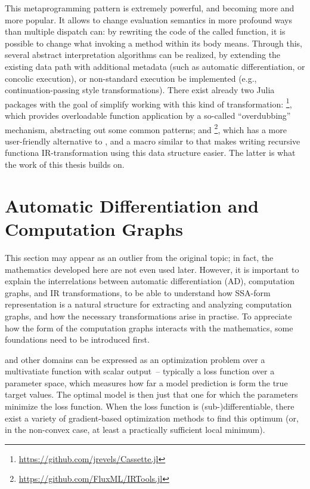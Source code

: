 This metaprogramming pattern is extremely powerful, and becoming more and more popular.  It allows
to change evaluation semantics in more profound ways than multiple dispatch can: by rewriting the
code of the called function, it is possible to change what invoking a method within its body means.
Through this, several abstract interpretation algorithms can be realized, by extending the existing
data path with additional metadata (such as automatic differentiation, or concolic execution), or
non-standard execution be implemented (e.g., continuation-passing style transformations).  There
exist already two Julia packages with the goal of simplify working with this kind of transformation:
\footnote{\protect\url{https://github.com/jrevels/Cassette.jl}}, which
provides overloadable function application by a so-called \enquote{overdubbing} mechanism,
abstracting out some common patterns; and
\footnote{\protect\url{https://github.com/FluxML/IRTools.jl}}, which has a
more user-friendly alternative to , and a macro similar to  that
makes writing recursive functiona IR-transformation using this data structure easier.  The latter is
what the work of this thesis builds on.


\section[Automatic Differentiation and Computation Graphs]{Automatic Differentiation and \newline
  Computation Graphs}
\label{sec:cg-ad}

This section may appear as an outlier from the original topic; in fact, the mathematics developed
here are not even used later.  However, it is important to explain the interrelations between
automatic differentiation (AD), computation graphs, and IR transformations, to be able to understand
how SSA-form representation is a natural structure for extracting and analyzing computation graphs,
and how the necessary transformations arise in practise.  To appreciate how the form of the
computation graphs interacts with the mathematics, some foundations need to be introduced first.

 and other domains can be expressed as an
optimization problem over a multivatiate function with scalar output~-- typically a loss function
over a parameter space, which measures how far a model prediction is form the true target values.
The optimal model is then just that one for which the parameters minimize the loss function.  When
the loss function is (sub-)differentiable, there exist a variety of gradient-based optimization
methods to find this optimum (or, in the non-convex case, at least a practically sufficient local
minimum).


